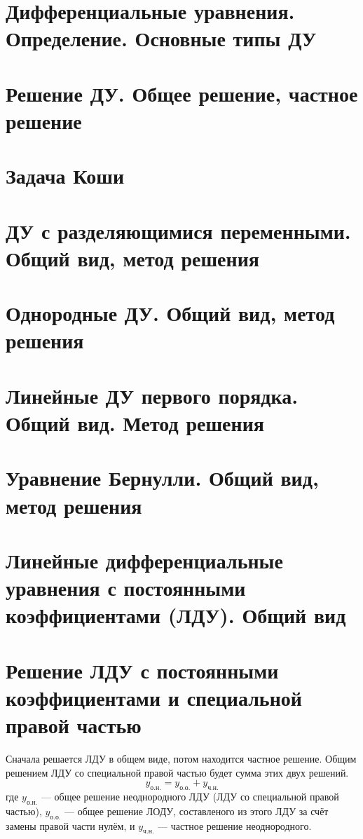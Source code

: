 \documentclass[12pt]{article}
\begin{document}
\section{Дифференциальные уравнения. Определение. Основные типы ДУ}

\section{Решение ДУ. Общее решение, частное решение}

\section{Задача Коши}

\section{ДУ с разделяющимися переменными. Общий вид, метод решения}

\section{Однородные ДУ. Общий вид, метод решения}

\section{Линейные ДУ первого порядка. Общий вид. Метод решения}

\section{Уравнение Бернулли. Общий вид, метод решения}

\section{Линейные дифференциальные уравнения с постоянными коэффициентами (ЛДУ).  Общий вид}

\section{Решение ЛДУ с постоянными коэффициентами и специальной правой частью}
Сначала решается ЛДУ в общем виде, потом находится частное решение. Общим решением ЛДУ со специальной правой частью будет сумма этих двух решений.
\[
    y_{\text{о.н.}} = y_{\text{о.о.}} + y_{\text{ч.н.}}
\]
где $y_{\text{о.н.}}$ — общее решение неоднородного ЛДУ (ЛДУ со специальной правой частью), $y_\text{о.о.}$ — общее решение ЛОДУ, составленого из этого ЛДУ за счёт замены правой части нулём, и $y_\text{ч.н.}$ — частное решение неоднородного.
\end{document}
